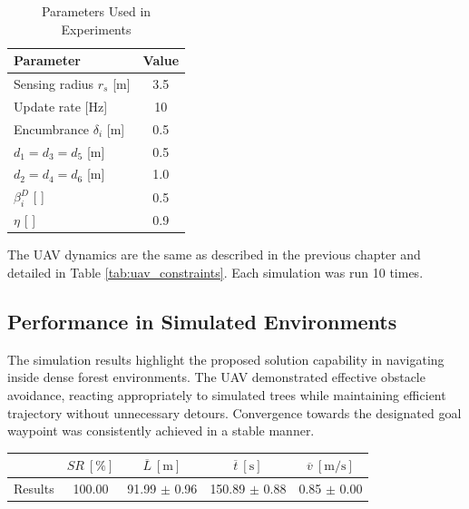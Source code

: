             \begin{table}[H]
                \centering
                \caption{Parameters Used in Experiments}
                \begin{tabular}{|l|c|}
                    \hline
                    Parameter & Value \\
                    \hline
                    \hline
                    Sensing radius $r_s$ [m] & 3.5 \\ \hline
                    Update rate [Hz] & 10  \\ \hline
                    Encumbrance $\delta_i$ [m] & 0.5  \\ \hline
                    $d_1 = d_3 = d_5$ [m] & 0.5  \\ \hline
                    $d_2 = d_4 = d_6$ [m] & 1.0  \\ \hline
                    $\beta_i^D$ [ ] & 0.5  \\ \hline
                    $\eta$ [ ] & 0.9  \\ \hline
                \end{tabular}
                \label{tab:rbl_forest_simulation_parameters}
            \end{table}
            
            The UAV dynamics are the same as described in the previous chapter and detailed in Table \ref{tab:uav_constraints}. 
            Each simulation was run 10 times.            

        \subsection{Performance in Simulated Environments}
            The simulation results highlight the proposed solution capability in navigating inside dense forest environments. 
            The UAV demonstrated effective obstacle avoidance, reacting appropriately to simulated trees while maintaining efficient trajectory without unnecessary detours.
            Convergence towards the designated goal waypoint was consistently achieved in a stable manner.

            \begin{table}[H]
                \centering
                \renewcommand{\arraystretch}{1.2}
                \begin{tabular}{|l|c|c|c|c|}
                \hline
                                                  & \( SR \ [\%] \) & \( \overline{L} \ [\mathrm{m}] \) & \( \overline{t} \ [\mathrm{s}] \) &  \( \overline{v} \ [\mathrm{m/s}] \)     \\ \hline
                Results                           & 100.00          & 91.99 $\pm$ 0.96                  & 150.89 $\pm$ 0.88                  &  0.85 $\pm$ 0.00                         \\ \hline
                \end{tabular}
            \end{table}

